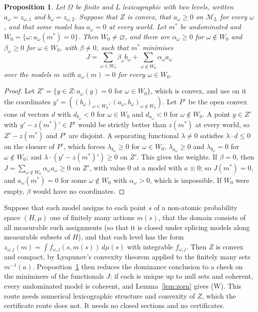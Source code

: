\documentclass[11pt]{article}
\newtheorem{proposition}[theorem]{Proposition}
\theoremstyle{definition}
\theoremstyle{remark}
\newcommand{\M}{\mathcal M}
\begin{document}
\begin{proposition}\label{prop:lexbayes}
Let $\Omega$ be finite and $L$ lexicographic with two levels, written $a_\omega=z_{\omega,1}$ and $b_\omega=z_{\omega,2}$. Suppose that $Z$ is convex, that $a_\omega\ge0$ on $\M_L$ for every $\omega$, and that some model has $a_\omega=0$ at every world. Let $m^*$ be undominated and $W_0=\{\omega:a_\omega(m^*)=0\}$. Then $W_0\ne\varnothing$, and there are $\alpha_\omega\ge0$ for $\omega\notin W_0$ and $\beta_\omega\ge0$ for $\omega\in W_0$, with $\beta\neq0$, such that $m^*$ minimises
\[
 J=\sum_{\omega\in W_0}\beta_\omega b_\omega+\sum_{\omega\notin W_0}\alpha_\omega a_\omega
\]
over the models $m$ with $a_\omega(m)=0$ for every $\omega\in W_0$.
\end{proposition}
\begin{proof}
Let $Z'=\{y\in Z:a_\omega(y)=0\text{ for }\omega\in W_0\}$, which is convex, and use on it the coordinates $y'=((b_\omega)_{\omega\in W_0},(a_\omega,b_\omega)_{\omega\notin W_0})$. Let $P^\circ$ be the open convex cone of vectors $d$ with $d_{b_\omega}<0$ for $\omega\in W_0$ and $d_{a_\omega}<0$ for $\omega\notin W_0$. A point $y\in Z'$ with $y'-z(m^*)'\in P^\circ$ would be strictly better than $z(m^*)$ at every world, so $Z'-z(m^*)$ and $P^\circ$ are disjoint. A separating functional $\lambda\ne0$ satisfies $\lambda\cdot d\le0$ on the closure of $P^\circ$, which forces $\lambda_{b_\omega}\ge0$ for $\omega\in W_0$, $\lambda_{a_\omega}\ge0$ and $\lambda_{b_\omega}=0$ for $\omega\notin W_0$; and $\lambda\cdot(y'-z(m^*)')\ge0$ on $Z'$. This gives the weights. If $\beta=0$, then $J=\sum_{\omega\notin W_0}\alpha_\omega a_\omega\ge0$ on $Z'$, with value $0$ at a model with $a\equiv0$; so $J(m^*)=0$, and $a_\omega(m^*)=0$ for some $\omega\notin W_0$ with $\alpha_\omega>0$, which is impossible. If $W_0$ were empty, $\beta$ would have no coordinates.
\end{proof}
Suppose that each model assigns to each point $s$ of a non-atomic probability space $(H,\mu)$ one of finitely many actions $m(s)$, that the domain consists of all measurable such assignments (so that it is closed under splicing models along measurable subsets of $H$), and that each level has the form $z_{\omega,j}(m)=\int f_{\omega,j}(s,m(s))\,d\mu(s)$ with integrable $f_{\omega,j}$. Then $Z$ is convex and compact, by Lyapunov's convexity theorem applied to the finitely many sets $m^{-1}(a)$. Proposition~\ref{prop:lexbayes} then reduces the dominance conclusion to a check on the minimisers of the functionals $J$: if each is unique up to null sets and coherent, every undominated model is coherent, and Lemma~\ref{lem:zorn} gives (W). This route needs numerical lexicographic structure and convexity of $Z$, which the certificate route does not. It needs no closed sections and no certificates.
\end{document}
